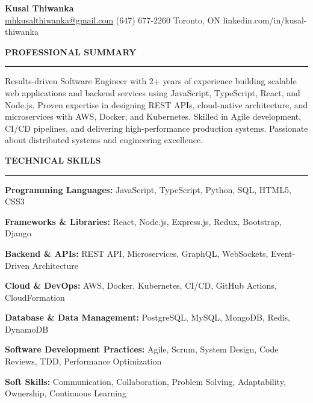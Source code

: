 \documentclass[10pt,letterpaper]{article}
\begin{document}
\begin{center}
{\LARGE\textbf{Kusal Thiwanka}}\\[3pt]
\href{mailto:mhkusalthiwanka@gmail.com}{mhkusalthiwanka@gmail.com}\hspace{2em}%
(647) 677{-}2260\hspace{2em}%
Toronto, ON\hspace{2em}
linkedin.com/in/kusal-thiwanka
\end{center}

\vspace{6pt}

\textbf{PROFESSIONAL SUMMARY}\\[-8pt]
\noindent\rule{\textwidth}{1pt}

\vspace{-2pt}

Results-driven Software Engineer with 2+ years of experience building scalable web applications and backend services using JavaScript, TypeScript, React, and Node.js. Proven expertise in designing REST APIs, cloud-native architecture, and microservices with AWS, Docker, and Kubernetes. Skilled in Agile development, CI/CD pipelines, and delivering high-performance production systems. Passionate about distributed systems and engineering excellence.

\vspace{8pt}

\textbf{TECHNICAL SKILLS}\\[-8pt]
\noindent\rule{\textwidth}{1pt}

\vspace{-2pt}

\textbf{Programming Languages:} JavaScript, TypeScript, Python, SQL, HTML5, CSS3

\textbf{Frameworks \& Libraries:} React, Node.js, Express.js, Redux, Bootstrap, Django

\textbf{Backend \& APIs:} REST API, Microservices, GraphQL, WebSockets, Event-Driven Architecture

\textbf{Cloud \& DevOps:} AWS, Docker, Kubernetes, CI/CD, GitHub Actions, CloudFormation

\textbf{Database \& Data Management:} PostgreSQL, MySQL, MongoDB, Redis, DynamoDB

\textbf{Software Development Practices:} Agile, Scrum, System Design, Code Reviews, TDD, Performance Optimization

\textbf{Soft Skills:} Communication, Collaboration, Problem Solving, Adaptability, Ownership, Continuous Learning
\end{document}
